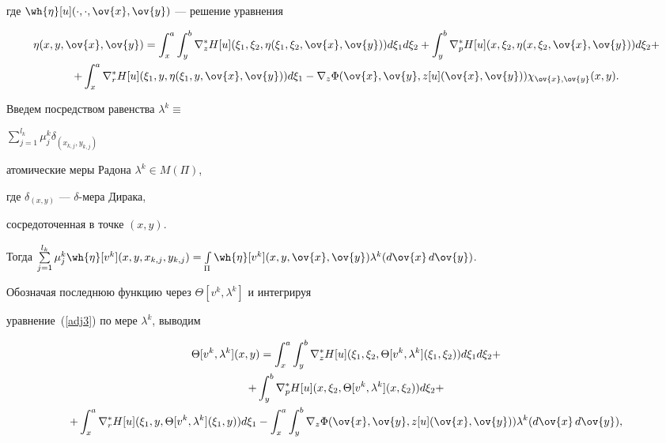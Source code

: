 где $\wh{\eta}[u](\cdot,\cdot,\ov{x},\ov{y})$ --- решение уравнения


\begin{multline}\label{adj3}


\eta(x,y,\ov{x},\ov{y})=


\int_x^{a}\int_y^{b}\nabla_z^*H[u](\xi_1,\xi_2,


\eta(\xi_1, \xi_2, \ov{x}, \ov{y})) d\xi_1 d\xi_2+ 


\int_y^{b}\nabla_p^*H[u](x, \xi_2, 


\eta(x, \xi_2, \ov{x}, \ov{y})) d\xi_2+ \\


%


+\int_x^{a}\nabla_r^*H[u](\xi_1, y, 


\eta(\xi_1, y, \ov{x}, \ov{y})) d\xi_1-


\nabla_z\Phi(\ov{x}, \ov{y},z[u](\ov{x}, \ov{y}))\chi_{\ov{x},\ov{y}}(x,y).


\end{multline}





Введем посредством равенства $\lambda^k\equiv$


$\sum\limits_{j=1}^{l_k}\mu_j^k\delta_{(x_{k,j},y_{k,j})}$


атомические меры Радона $\lambda^k\in M(\Pi)$,


где $\delta_{(x, y)}$ --- $\delta$-мера Дирака,


сосредоточенная в точке $(x, y)$.





Тогда $\sum\limits_{j=1}^{l_k}\mu_j^k\wh{\eta}[v^k](x, y, x_{k, j}, y_{k, j})=


\int\limits_\Pi\wh{\eta}[v^k](x, y, \ov{x}, \ov{y})\lambda^k(d\ov{x}\,d\ov{y})$.


Обозначая последнюю функцию через $\Theta[v^k,\lambda^k]$ и интегрируя


уравнение~(\ref{adj3}) по мере $\lambda^k$, выводим


\begin{multline*}


\Theta[v^k,\lambda^k](x, y)=


\displaystyle\int_x^{a}\int_y^{b}\nabla_z^*H[u](\xi_1, \xi_2, 


\Theta[v^k,\lambda^k](\xi_1, \xi_2)) d\xi_1 d\xi_2+\\


%


+\int_y^{b}\nabla_p^*H[u](x, \xi_2, 


\Theta[v^k,\lambda^k](x, \xi_2)) d\xi_2+ \\


%


+\int_x^{a}\nabla_r^*H[u](\xi_1, y, 


\Theta[v^k,\lambda^k](\xi_1, y)) d\xi_1-


\int_x^a\int_y^b\nabla_z\Phi(\ov{x},


\ov{y},z[u](\ov{x}, \ov{y}))\lambda^k(d\ov{x}\,d\ov{y}),


\end{multline*}


